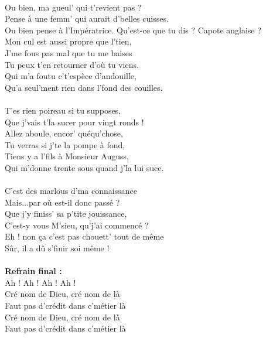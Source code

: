 \\Ou bien, ma gueul' qui t'revient pas ?
\\Pense à une femm' qui aurait d'belles cuisses.
\\Ou bien pense à l'Impératrice.
\breakpage
Qu'est-ce que tu dis ? Capote anglaise ?
\\Mon cul est aussi propre que l'tien,
\\J'me fous pas mal que tu me baises
\\Tu peux t'en retourner d'où tu viens.
\\Qui m'a foutu c't'espèce d'andouille,
\\Qu'a seul'ment rien dans l'fond des couilles.
\\\\T'es rien poireau si tu supposes,
\\Que j'vais t'la sucer pour vingt ronds !
\\Allez aboule, encor' quéqu'chose,
\\Tu verras si j'te la pompe à fond,
\\Tiens y a l'fils à Monsieur Auguss,
\\Qui m'donne trente sous quand j'la lui suce.
\\\\C'est des marlous d'ma connaissance
\\Mais...par où est-il donc passé ?
\\Que j'y finiss' sa p'tite jouissance,
\\C'est-y vous M'sieu, qu'j'ai commencé ?
\\Eh ! non ça c'est pas chouett' tout de même
\\Sûr, il a dû s'finir soi même !
\\\\\textbf{Refrain final :}
\\Ah ! Ah ! Ah ! Ah !
\\Cré nom de Dieu, cré nom de là
\\Faut pas d'crédit dans c'métier là
\\Cré nom de Dieu, cré nom de là
\\Faut pas d'crédit dans c'métier là
\\

\breakpage